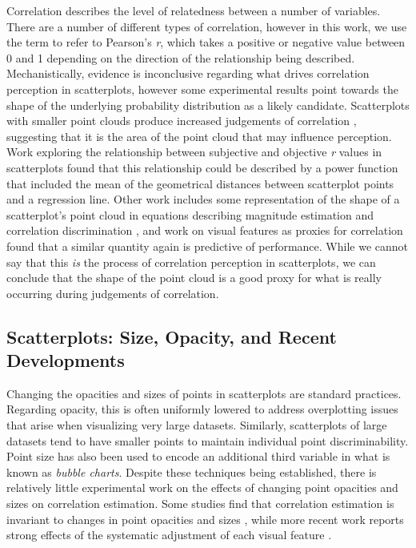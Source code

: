 \documentclass[manuscript,screen,review]{acmart}
\begin{document}
Correlation describes the level of relatedness between a number of
variables. There are a number of different types of correlation, however
in this work, we use the term to refer to Pearson's \emph{r}, which
takes a positive or negative value between 0 and 1 depending on the
direction of the relationship being described. Mechanistically, evidence
is inconclusive regarding what drives correlation perception in
scatterplots, however some experimental results point towards the shape
of the underlying probability distribution as a likely candidate.
Scatterplots with smaller point clouds produce increased judgements of
correlation \citep{cleveland_1982}, suggesting that it is the area of
the point cloud that may influence perception. Work exploring the
relationship between subjective and objective \emph{r} values in
scatterplots found that this relationship could be described by a power
function that included the mean of the geometrical distances between
scatterplot points and a regression line. Other work includes some
representation of the shape of a scatterplot's point cloud in equations
describing magnitude estimation and correlation discrimination
\citep{meyer_1997, rensink_2017}, and work on visual features as proxies
for correlation found that a similar quantity again is predictive of
performance. While we cannot say that this \emph{is} the process of
correlation perception in scatterplots, we can conclude that the shape
of the point cloud is a good proxy for what is really occurring during
judgements of correlation.

\subsection{Scatterplots: Size, Opacity, and Recent
Developments}\label{scatterplots-size-opacity-and-recent-developments}

Changing the opacities and sizes of points in scatterplots are standard
practices. Regarding opacity, this is often uniformly lowered to address
overplotting \citep{matejka_2015} issues that arise when visualizing
very large datasets. Similarly, scatterplots of large datasets tend to
have smaller points to maintain individual point discriminability. Point
size has also been used to encode an additional third variable in what
is known as \emph{bubble charts}. Despite these techniques being
established, there is relatively little experimental work on the effects
of changing point opacities and sizes on correlation estimation. Some
studies find that correlation estimation is invariant to changes in
point opacities and sizes \citep{rensink_2014, rensink_2017}, while more
recent work reports strong effects of the systematic adjustment of each
visual feature \citep{strain_2023, strain_2023b, strain_2024}.
\end{document}
